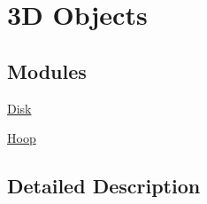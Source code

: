 \hypertarget{group___e_g_x_math-_geometry-3_d}{}\section{3D Objects}
\label{group___e_g_x_math-_geometry-3_d}
\subsection*{Modules}
\begin{DoxyCompactItemize}
\item 
\mbox{\hyperlink{group___e_g_x_math-_geometry-3_d-_disk}{Disk}}
\item 
\mbox{\hyperlink{group___e_g_x_math-_geometry-3_d-_hoop}{Hoop}}
\end{DoxyCompactItemize}


\subsection{Detailed Description}
